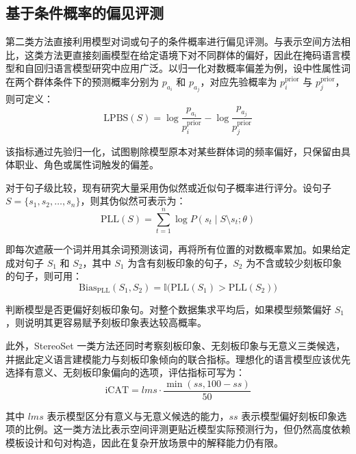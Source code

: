 \subsection{基于条件概率的偏见评测}

第二类方法直接利用模型对词或句子的条件概率进行偏见评测。与表示空间方法相比，这类方法更直接刻画模型在给定语境下对不同群体的偏好，因此在掩码语言模型和自回归语言模型研究中应用广泛。以归一化对数概率偏差为例，设中性属性词在两个群体条件下的预测概率分别为 $p_{a_i}$ 和 $p_{a_j}$，对应先验概率为 $p^{\text{prior}}_{i}$ 与 $p^{\text{prior}}_{j}$，则可定义：
\begin{equation}
\mathrm{LPBS}(S)=\log \frac{p_{a_i}}{p^{\text{prior}}_{i}}-\log \frac{p_{a_j}}{p^{\text{prior}}_{j}}
\end{equation}

该指标通过先验归一化，试图剔除模型原本对某些群体词的频率偏好，只保留由具体职业、角色或属性词触发的偏差\cite{DBLP:journals/corr/abs-1906-07337}。

对于句子级比较，现有研究大量采用伪似然或近似句子概率进行评分。设句子 $S=\{s_1,s_2,\dots,s_n\}$，则其伪似然可表示为：
\begin{equation}
\mathrm{PLL}(S)=\sum_{t=1}^{n}\log P(s_t \mid S \setminus s_t;\theta)
\end{equation}

即每次遮蔽一个词并用其余词预测该词，再将所有位置的对数概率累加。如果给定成对句子 $S_1$ 和 $S_2$，其中 $S_1$ 为含有刻板印象的句子，$S_2$ 为不含或较少刻板印象的句子，则可用：
\begin{equation}
\mathrm{Bias}_{\mathrm{PLL}}(S_1,S_2)=\mathbb{I}\big(\mathrm{PLL}(S_1)>\mathrm{PLL}(S_2)\big)
\end{equation}

判断模型是否更偏好刻板印象句。对整个数据集求平均后，如果模型频繁偏好 $S_1$，则说明其更容易赋予刻板印象表达较高概率\cite{DBLP:conf/emnlp/NangiaVBB20,DBLP:conf/acl/NadeemBR20,DBLP:conf/aaai/KanekoB22}。

此外，StereoSet 一类方法还同时考察刻板印象、无刻板印象与无意义三类候选，并据此定义语言建模能力与刻板印象倾向的联合指标。理想化的语言模型应该优先选择有意义、无刻板印象偏向的选项，评估指标可写为：
\begin{equation}
\mathrm{iCAT}=lms \cdot \frac{\min(ss,100-ss)}{50}
\end{equation}

其中 $lms$ 表示模型区分有意义与无意义候选的能力，$ss$ 表示模型偏好刻板印象选项的比例。这一类方法比表示空间评测更贴近模型实际预测行为，但仍然高度依赖模板设计和句对构造，因此在复杂开放场景中的解释能力仍有限\cite{DBLP:conf/naacl/DelobelleTCB22,DBLP:journals/coling/GallegosRBTKDYZA24}。

